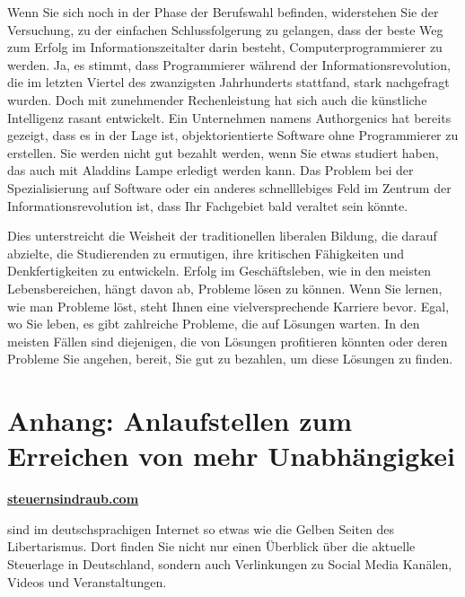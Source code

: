 \documentclass[
  a5paper,
  smalldemyvopaper,10pt,twoside,onecolumn,openright,extrafontsizes,hidelinks]{memoir}
\begin{document}
Wenn Sie sich noch in der Phase der Berufswahl befinden, widerstehen Sie
der Versuchung, zu der einfachen Schlussfolgerung zu gelangen, dass der
beste Weg zum Erfolg im Informationszeitalter darin besteht,
Computerprogrammierer zu werden. Ja, es stimmt, dass Programmierer
während der Informationsrevolution, die im letzten Viertel des
zwanzigsten Jahrhunderts stattfand, stark nachgefragt wurden. Doch mit
zunehmender Rechenleistung hat sich auch die künstliche Intelligenz
rasant entwickelt. Ein Unternehmen namens Authorgenics hat bereits
gezeigt, dass es in der Lage ist, objektorientierte Software ohne
Programmierer zu erstellen. Sie werden nicht gut bezahlt werden, wenn
Sie etwas studiert haben, das auch mit Aladdins Lampe erledigt werden
kann. Das Problem bei der Spezialisierung auf Software oder ein anderes
schnelllebiges Feld im Zentrum der Informationsrevolution ist, dass Ihr
Fachgebiet bald veraltet sein könnte.

Dies unterstreicht die Weisheit der traditionellen liberalen Bildung,
die darauf abzielte, die Studierenden zu ermutigen, ihre kritischen
Fähigkeiten und Denkfertigkeiten zu entwickeln. Erfolg im
Geschäftsleben, wie in den meisten Lebensbereichen, hängt davon ab,
Probleme lösen zu können. Wenn Sie lernen, wie man Probleme löst, steht
Ihnen eine vielversprechende Karriere bevor. Egal, wo Sie leben, es gibt
zahlreiche Probleme, die auf Lösungen warten. In den meisten Fällen sind
diejenigen, die von Lösungen profitieren könnten oder deren Probleme Sie
angehen, bereit, Sie gut zu bezahlen, um diese Lösungen zu finden.


\chapter*{Anhang: Anlaufstellen zum Erreichen von mehr
Unabhängigkei}\label{anhang-anlaufstellen-zum-erreichen-von-mehr-unabhuxe4ngigkei}


\href{https://steuernsindraub.com/}{\textbf{steuernsindraub.com}}

\vspace{1em}

sind im deutschsprachigen Internet so etwas wie die Gelben Seiten des
Libertarismus. Dort finden Sie nicht nur einen Überblick über die
aktuelle Steuerlage in Deutschland, sondern auch Verlinkungen zu Social
Media Kanälen, Videos und Veranstaltungen.
\end{document}
